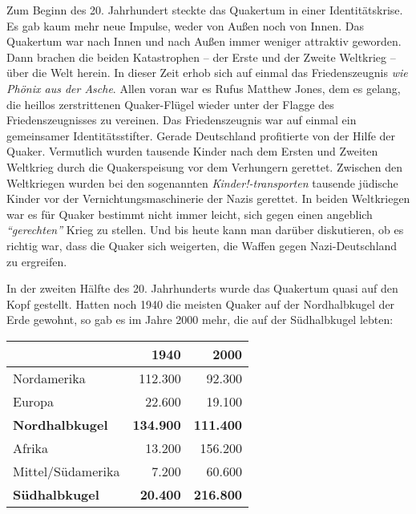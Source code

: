 Zum Beginn des 20. Jahrhundert steckte das Quakertum in einer Identitätskrise.
Es gab kaum mehr neue Impulse, weder von Außen
noch von Innen. Das Quakertum war
nach Innen und nach Außen immer weniger attraktiv geworden. Dann brachen die
beiden Katastrophen -- der Erste und der Zweite Weltkrieg --
über die Welt
herein. In dieser Zeit erhob sich auf einmal das Friedenszeugnis
\textit{wie
Phönix aus der Asche}. Allen voran war es Rufus Matthew Jones,
 dem
es gelang, die heillos zerstrittenen Quaker-Flügel wieder unter der Flagge des
Friedenszeugnisses zu vereinen. Das Friedenszeugnis war auf einmal ein
gemeinsamer Identitätsstifter. Gerade Deutschland
 profitierte von der Hilfe der
Quaker. Vermutlich wurden tausende Kinder nach dem Ersten und Zweiten Weltkrieg
durch die Quakerspeisung vor dem Verhungern gerettet.
Zwischen den Weltkriegen
wurden bei den sogenannten \textit{Kinder!-transporten}
tausende jüdische Kinder
vor der Vernichtungsmaschinerie der Nazis gerettet. In beiden Weltkriegen war es
für Quaker bestimmt nicht immer leicht, sich gegen einen
angeblich \textit{"`gerechten"'}
Krieg zu stellen. Und bis heute kann man darüber diskutieren, ob es richtig
war, dass die Quaker sich weigerten, die Waffen gegen Nazi-Deutschland zu
ergreifen.

\medskip

In der zweiten Hälfte des 20. Jahrhunderts wurde das Quakertum quasi auf den
Kopf
gestellt. Hatten noch 1940 die meisten Quaker auf der Nordhalbkugel der Erde
gewohnt, so gab es im Jahre 2000 mehr, die auf der Südhalbkugel lebten:

\begin{center}
\begin{tabular}{|l|r|r|} \hline
                        & \textbf{1940}        & \textbf{2000}    \\ \hline
\hline
Nordamerika             & 112.300              & 92.300           \\ \hline
Europa                  & 22.600               & 19.100           \\ \hline
\textbf{Nordhalbkugel}  & \textbf{134.900}     & \textbf{111.400} \\ \hline
Afrika                  & 13.200               & 156.200          \\ \hline
Mittel/Südamerika       & 7.200                & 60.600           \\ \hline
\textbf{Südhalbkugel}   & \textbf{20.400}      & \textbf{216.800} \\ \hline
\end{tabular}
\end{center}


